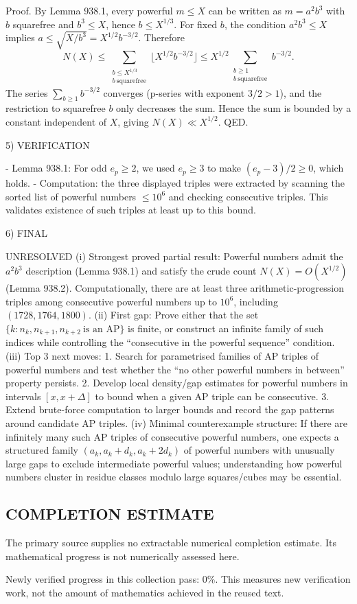 Proof.
By Lemma 938.1, every powerful \(m\le X\) can be written as \(m=a^2 b^3\) with \(b\) squarefree and \(b^3\le X\), hence \(b\le X^{1/3}\).
For fixed \(b\), the condition \(a^2 b^3\le X\) implies \(a\le \sqrt{X/b^3}=X^{1/2} b^{-3/2}\). Therefore
\[N(X) \le \sum_{\substack{b\le X^{1/3}\\ b\ \mathrm{squarefree}}} \Big\lfloor X^{1/2} b^{-3/2}\Big\rfloor
\le X^{1/2} \sum_{\substack{b\ge 1\\ b\ \mathrm{squarefree}}} b^{-3/2}.
\]
The series \(\sum_{b\ge 1} b^{-3/2}\) converges (p-series with exponent \(3/2>1\)), and the restriction to squarefree \(b\) only decreases the sum. Hence the sum is bounded by a constant independent of \(X\), giving \(N(X)\ll X^{1/2}\). QED.

5) VERIFICATION

- Lemma 938.1: For odd \(e_p\ge2\), we used \(e_p\ge3\) to make \((e_p-3)/2\ge0\), which holds.
- Computation: the three displayed triples were extracted by scanning the sorted list of powerful numbers \(\le 10^6\) and checking consecutive triples. This validates existence of such triples at least up to this bound.

6) FINAL

UNRESOLVED
(i) Strongest proved partial result: Powerful numbers admit the \(a^2b^3\) description (Lemma 938.1) and satisfy the crude count \(N(X)=O(X^{1/2})\) (Lemma 938.2). Computationally, there are at least three arithmetic-progression triples among consecutive powerful numbers up to \(10^6\), including \((1728,1764,1800)\).
(ii) First gap: Prove either that the set \(\{k: n_k,n_{k+1},n_{k+2}\ \text{is an AP}\}\) is finite, or construct an infinite family of such indices while controlling the ``consecutive in the powerful sequence'' condition.
(iii) Top 3 next moves:
  1. Search for parametrised families of AP triples of powerful numbers and test whether the ``no other powerful numbers in between'' property persists.
  2. Develop local density/gap estimates for powerful numbers in intervals \([x,x+\Delta]\) to bound when a given AP triple can be consecutive.
  3. Extend brute-force computation to larger bounds and record the gap patterns around candidate AP triples.
(iv) Minimal counterexample structure: If there are infinitely many such AP triples of consecutive powerful numbers, one expects a structured family \((a_k, a_k+d_k, a_k+2d_k)\) of powerful numbers with unusually large gaps to exclude intermediate powerful values; understanding how powerful numbers cluster in residue classes modulo large squares/cubes may be essential.




\subsection*{COMPLETION ESTIMATE}
The primary source supplies no extractable numerical completion estimate. Its mathematical progress is not numerically assessed here.

Newly verified progress in this collection pass: $0\%$. This measures new verification work, not the amount of mathematics achieved in the reused text.
